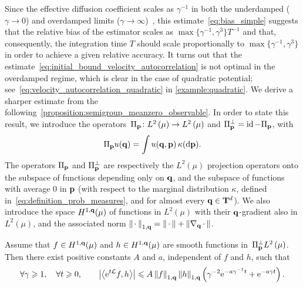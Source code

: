 \documentclass[11pt,a4paper]{article}
\begin{document}
Since the effective diffusion coefficient scales as $\gamma^{-1}$ in both the underdamped ($\gamma \to 0$) and overdamped limits ($\gamma \to \infty$)~\cite{MR2394704,MR2427108},
this estimate~\eqref{eq:bias_simple} suggests that the relative bias of the estimator scales as $\max\{\gamma^{-1}, \gamma^3\} T^{-1}$ and that,
consequently, the integration time $T$ should scale proportionally to $\max\{\gamma^{-1}, \gamma^3\}$ in order to achieve a given relative accuracy.
It turns out that the estimate~\eqref{eq:initial_bound_velocity_autocorrelation} is not optimal in the overdamped regime,
which is clear in the case of quadratic potential; see~\eqref{eq:velocity_autocorrelation_quadratic} in \cref{example:quadratic}.
We derive a sharper estimate from the following~\cref{proposition:semigroup_meanzero_observable}.
In order to state this result,
we introduce the operators~$\Pi_{\vect p}\colon \lp{2}{\mu} \rightarrow \lp{2}{\mu}$ and  $\Pi_{\boldsymbol{\mathbf p}}^\perp = \operatorname{id} - \Pi_{\boldsymbol{\mathbf p}}$,
with
\[
    \Pi_{\boldsymbol{\mathbf p}} u (\boldsymbol{\mathbf q}) = \int u(\boldsymbol{\mathbf q}, \boldsymbol{\mathbf p}) \, \kappa(\mathrm d \boldsymbol{\mathbf p}).
\]
The operators $\Pi_{\boldsymbol{\mathbf p}}$ and $\Pi_{\boldsymbol{\mathbf p}}^\perp$ are respectively the $L^2(\mu)$ projection operators onto
the subspace of functions depending only on $\boldsymbol{\mathbf q}$,
and the subspace of functions with average $0$ in $\boldsymbol{\mathbf p}$ (with respect to the marginal distribution $\kappa$, defined in~\eqref{eq:definition_prob_measures}, and for almost every $\boldsymbol{\mathbf q} \in \mathbf T^d$).
We also introduce the space $H^{1,\boldsymbol{\mathbf q}}(\mu)$ of functions in $L^2(\mu)$ with their $\boldsymbol{\mathbf q}$-gradient also in $L^2(\mu)$,
and the associated norm $\norm{\dummy}[1,\vect q] = \norm{\dummy} + \norm{\grad_{\vect q} \dummy}$.
\begin{proposition}
    \label{proposition:semigroup_meanzero_observable}
    Assume that $f \in H^{1,\boldsymbol{\mathbf q}}(\mu)$ and $h \in H^{1,\boldsymbol{\mathbf q}}(\mu)$ are smooth functions in~$\Pi_{\vect p}^\perp \lp{2}{\mu}$.
    Then there exist positive constants $A$ and $a$, independent of $f$ and $h$, such that
    \begin{equation}
        \label{eq:optimal_decay_correlation}
        \forall \gamma \geq 1, \quad
        \forall t \geq 0, \qquad
        \abs{\ip{\e^{t \mathcal L}f}{h}}
        \leq A \norm{f}[1,\vect q]  \norm{h}[1,\vect q] \left( \gamma^{-2} \e^{- a \gamma^{-1} t} + \e^{- a \gamma t} \right).
    \end{equation}
\end{proposition}
\end{document}
